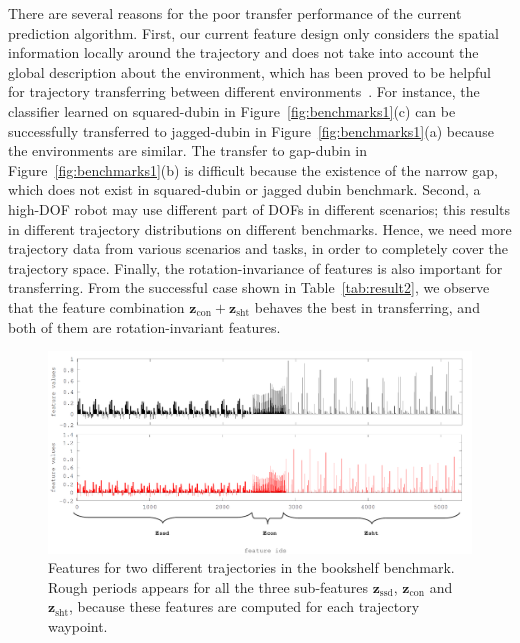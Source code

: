 \documentclass[letterpaper, 10 pt, conference]{ieeeconf}  %
\newcommand{\fssd}{\mbox{$\mathbf z_{\text{ssd}}$}}
\newcommand{\fcon}{\mbox{$\mathbf z_{\text{con}}$}}
\newcommand{\fsht}{\mbox{$\mathbf z_{\text{sht}}$}}
\begin{document}
There are several reasons for the poor transfer performance of the current prediction algorithm. First, our current feature design only considers the spatial information locally around the trajectory and does not take into account the global description about the environment, which has been proved to be helpful for trajectory transferring between different environments~\cite{Jetchev:2013:FMP}. For instance, the classifier learned on squared-dubin in Figure~\ref{fig:benchmarks1}(c) can be successfully transferred to jagged-dubin in Figure~\ref{fig:benchmarks1}(a) because the environments are similar. The transfer to gap-dubin in Figure~\ref{fig:benchmarks1}(b) is difficult because the existence of the narrow gap, which does not exist in squared-dubin or jagged dubin benchmark. Second, a high-DOF robot may use different part of DOFs in different scenarios; this results in different trajectory distributions on different benchmarks. Hence, we need more trajectory data from various scenarios and tasks, in order to completely cover the trajectory space. Finally, the rotation-invariance of features is also important for transferring. From the successful case shown in Table~\ref{tab:result2}, we observe that the feature combination $\fcon+\fsht$ behaves the best in transferring, and both of them are rotation-invariant features. 

\begin{figure}[t]
\centering
\includegraphics[width=0.8\linewidth]{figure/features.pdf}
\caption{Features for two different trajectories in the bookshelf benchmark. Rough periods appears for all the three sub-features $\fssd$, $\fcon$ and $\fsht$, because these features are computed for each trajectory waypoint.}
\label{fig:features}
\end{figure}
\end{document}
